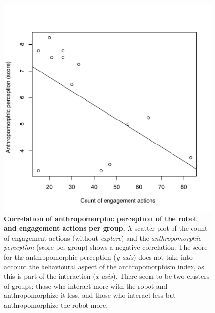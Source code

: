\documentclass{sig-alternate}
\begin{document}
\begin{figure}[t]
    \centering
    \includegraphics[width=0.7\columnwidth]{domino-correlation.pdf}   

    \caption[Correlation of Anthropomorphic Perception of the Robot and
    Interaction]{\small \textbf{Correlation of anthropomorphic perception of the
    robot and engagement actions per group.} A scatter plot of the count of engagement
    actions (without \emph{explore}) and the \textit{anthropomorphic perception} (score per
    group) shows a negative correlation. The score for the anthropomorphic
    perception (\textit{y-axis}) does not take into account the behavioural aspect of
    the anthropomorphism index, as this is part of the interaction
    (\textit{x-axis}).  There seem to be two clusters of groups: those who interact
    more with the robot and anthropomorphize it less, and those who interact less
    but anthropomorphize the robot more.}

    \label{fig:domino-anthropo-interaction}
\end{figure}	

\end{document}
